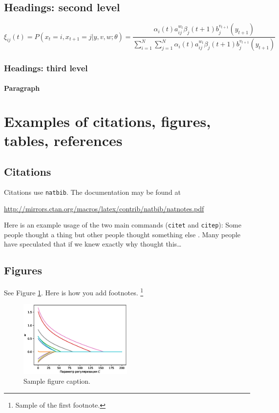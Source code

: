 \documentclass{article}
\begin{document}
\subsection{Headings: second level}
\lipsum[5]
\begin{equation}
	\xi _{ij}(t)=P(x_{t}=i,x_{t+1}=j|y,v,w;\theta)= {\frac {\alpha _{i}(t)a^{w_t}_{ij}\beta _{j}(t+1)b^{v_{t+1}}_{j}(y_{t+1})}{\sum _{i=1}^{N} \sum _{j=1}^{N} \alpha _{i}(t)a^{w_t}_{ij}\beta _{j}(t+1)b^{v_{t+1}}_{j}(y_{t+1})}}
\end{equation}

\subsubsection{Headings: third level}
\lipsum[6]

\paragraph{Paragraph}
\lipsum[7]



\section{Examples of citations, figures, tables, references}
\label{sec:others}

\subsection{Citations}
Citations use \verb+natbib+. The documentation may be found at
\begin{center}
	\url{http://mirrors.ctan.org/macros/latex/contrib/natbib/natnotes.pdf}
\end{center}

Here is an example usage of the two main commands (\verb+citet+ and \verb+citep+): Some people thought a thing \citep{kour2014real, hadash2018estimate} but other people thought something else \citep{kour2014fast}. Many people have speculated that if we knew exactly why \citet{kour2014fast} thought this\dots

\subsection{Figures}
\lipsum[10]
See Figure \ref{fig:fig1}. Here is how you add footnotes. \footnote{Sample of the first footnote.}
\lipsum[11]

\begin{figure}
	\centering
	\includegraphics[width=0.5\textwidth]{../figures/log_reg_cs_exp.eps}
	\caption{Sample figure caption.}
	\label{fig:fig1}
\end{figure}
\end{document}
